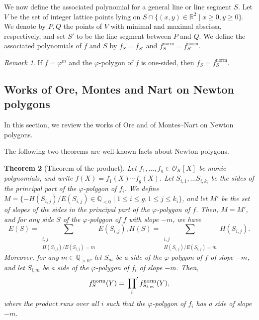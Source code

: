 \documentclass{article}
\newcommand{\field}[1]{\mathbb{#1}}
\newcommand{\Q}{\field{Q}}
\newcommand{\R}{\field{R}}
\newtheorem{theorem}{Theorem}[section]
\theoremstyle{definition}
\theoremstyle{remark}
\newtheorem{remark}[theorem]{Remark}
\numberwithin{equation}{section}
\begin{document}
    We now define the associated polynomial for a general line or line segment $S$. 
    Let $V$ be the set of integer lattice points lying on $S \cap \{ (x,y) \in \R^2 \mid x \ge 0, y \ge 0 \}$. 
    We denote by $P, Q$ the points of $V$ with minimal and maximal abscissa, respectively, and 
    set $S'$ to be the line segment between $P$ and $Q$. 
    We define the associated polynomials of $f$ and $S$ by $f_S = f_{S'}$ and $f^{\mathrm{norm}}_S = f^{\mathrm{norm}}_{S'}$. 

    \begin{remark}
      If $f = \varphi^m$ and the $\varphi$-polygon of $f$ is one-sided, then $f_S = f_S^{\mathrm{norm}}$. 
    \end{remark}

  \subsection{Works of Ore, Montes and Nart on Newton polygons}\label{sec:Ore Montes Nart}
    
    In this section, we review the works of Ore and of Montes--Nart on Newton polygons. 

    The following two theorems are well-known facts about Newton polygons.

    \begin{theorem}[Theorem of the product]\label{thm:theorem of product}
      Let $f_1, \dots ,f_g \in \mathcal{O}_K[X]$ be monic polynomials, and write 
      $f(X) = f_1(X) \cdots f_g(X)$. 
      Let $S_{i,1}, \dots S_{i,k_i}$ be the sides of the principal part of the $\varphi$-polygon 
      of $f_i$. We define $M=\{-H(S_{i,j})/E(S_{i,j}) \in \Q_{< 0} \mid 1 \le i \le g,1 \le j \le k_i\}$, 
      and let $M'$ be the set of slopes of the sides in the principal part of the $\varphi$-polygon of $f$. 
      Then, $M=M'$, and for any side $S$ of the $\varphi$-polygon of $f$ with slope $-m$, we have 
      \[
        E(S)=\sum_{\substack{i,j\\H(S_{i,j})/E(S_{i,j})=m}} E(S_{i,j}), H(S)=\sum_{\substack{i,j\\H(S_{i,j})/E(S_{i,j})=m}} H(S_{i,j}). 
      \]
      Moreover, for any $m \in \Q_{>0}$, let $S_m$ be a side of the $\varphi$-polygon of $f$ of slope $-m$, 
      and let $S_{i,m}$ be a side of the $\varphi$-polygon of $f_i$ of slope $-m$. 
      Then, 
      \[
        f_S^{\mathrm{norm}}(Y) = \sideset{}{'}\prod_{i}f_{S_{i,m}}^{\mathrm{norm}}(Y), 
      \]
      where the product runs over all $i$ such that the $\varphi$-polygon of $f_i$ has a side of slope $-m$. 
    \end{theorem}
\end{document}
